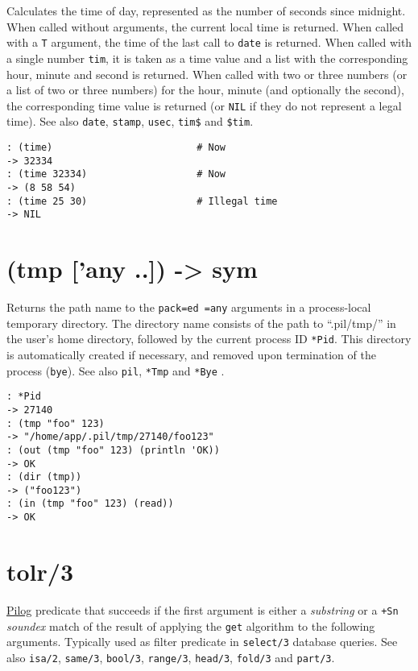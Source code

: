 {{{{{{{{Calculates the time of day, represented as the number of seconds since
midnight. When called without arguments, the current local time is
returned. When called with a \texttt{T} argument, the time of the last call to
\texttt{date} is returned. When called with a single number \texttt{tim}, it is taken
as a time value and a list with the corresponding hour, minute and
second is returned. When called with two or three numbers (or a list of
two or three numbers) for the hour, minute (and optionally the second),
the corresponding time value is returned (or \texttt{NIL} if they do not
represent a legal time). See also \texttt{date}, \texttt{stamp}, \texttt{usec}, \texttt{tim\$} and
\texttt{\$tim}.


\begin{verbatim}
: (time)                         # Now
-> 32334
: (time 32334)                   # Now
-> (8 58 54)
: (time 25 30)                   # Illegal time
-> NIL
\end{verbatim}

 
\section{(tmp ['any ..]) -> sym}
\label{sec-8-1-20-20}


Returns the path name to the \texttt{pack=ed =any} arguments in a process-local
temporary directory. The directory name consists of the path to
``.pil/tmp/'' in the user's home directory, followed by the current
process ID \texttt{*Pid}. This directory is automatically created if necessary,
and removed upon termination of the process (\texttt{bye}). See also \texttt{pil},
\texttt{*Tmp} and \texttt{*Bye} .


\begin{verbatim}
: *Pid
-> 27140
: (tmp "foo" 123)
-> "/home/app/.pil/tmp/27140/foo123"
: (out (tmp "foo" 123) (println 'OK))
-> OK
: (dir (tmp))
-> ("foo123")
: (in (tmp "foo" 123) (read))
-> OK
\end{verbatim}

 
\section{tolr/3}
\label{sec-8-1-20-21}


\hyperref[ref.html-pilog]{Pilog} predicate that succeeds if the first argument
is either a \emph{substring} or a \texttt{+Sn} \emph{soundex} match of the result of
applying the \texttt{get} algorithm to the following arguments. Typically used
as filter predicate in \texttt{select/3} database queries. See also \texttt{isa/2},
\texttt{same/3}, \texttt{bool/3}, \texttt{range/3}, \texttt{head/3}, \texttt{fold/3} and \texttt{part/3}.


}}}}}}}}
